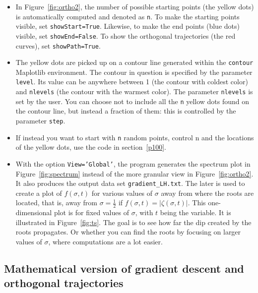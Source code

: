 \documentclass[oneside,10pt]{book}
\begin{document}
\begin{itemize}
\item In Figure~\ref{fig:ortho2}, the number of possible starting points (the yellow dots) is automatically computed and denoted as \texttt{n}. To make the
 starting points visible, set \texttt{showStart=True}. Likewise, to make the end points (blue dots) visible, set \texttt{showEnd=False}.
 To show the orthogonal trajectories (the red curves), set \texttt{showPath=True}.
\item  The yellow dots are picked up on a contour line generated within the \texttt{contour} Maplotlib environment. The contour in question
 is specified by the parameter \texttt{level}. Its value can be anywhere between 1 (the contour with coldest color) and \texttt{nlevels} (the
 contour with the warmest color). The parameter \texttt{nlevels} is set by the user. You can choose not to include all the \texttt{n} yellow dots
 found on the contour line, but instead a fraction of them:  this is controlled by the parameter \texttt{step}.
\item If instead you want to start with \texttt{n} random points, control {n} and the locations of the yellow dots, use the code in section~\ref{p100}.
\item With the option \texttt{View='Global'}, the program generates the spectrum plot in Figure~\ref{fig:spectrum} instead of the
 more granular view in Figure~\ref{fig:ortho2}. It also produces the output data set \texttt{gradient\_LH.txt}. The later is used to create a plot of
 $f(\sigma, t)$ for various values of $\sigma$ away from where the roots are located, that is, away from $\sigma=\frac{1}{2}$
 if $f(\sigma,t)=|\zeta(\sigma,t)|$. This one-dimensional plot is for fixed values of $\sigma$, with $t$ being the variable. It is illustrated in Figure~\ref{fig:ts}. The goal is to see how far the dip created by the roots propagates. Or whether you can find the roots by focusing on larger values of $\sigma$, where computations are a lot easier.
\end{itemize}



\subsection{Mathematical version of gradient descent and orthogonal trajectories}\label{tretra}
\end{document}
